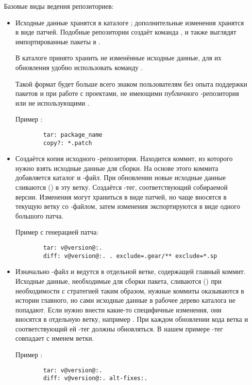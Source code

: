 Базовые виды ведения  репозиториев:
\begin{itemize}
	\item {}
	
	Исходные данные хранятся в каталоге ; дополнительные изменения хранятся в виде патчей.
		Подобные репозитории создаёт команда , и также выглядят импортированные
		пакеты в .
	
	В каталоге  принято хранить не изменённые исходные данные, для их обновления удобно
		использовать команду .
	
	Такой формат будет больше всего знаком пользователям без опыта поддержки пакетов 
		и при работе с проектами, не имеющими публичного -репозитория или не использующими .
	
	Пример :
\begin{verbatim}
        tar: package_name
        copy?: *.patch
\end{verbatim}
	
	\item {}
	
	Создаётся копия исходного -репозитория. Находится коммит, из которого нужно взять исходные
	данные для сборки. На основе этого коммита добавляется каталог  и -файл.
	При обновлении новые исходные данные сливаются () в эту ветку. Создаётся -тег,
	соответствующий собираемой версии. Изменения могут храниться в виде патчей, но чаще вносятся в
	текущую ветку со -файлом, затем изменения экспортируются в виде одного большого патча.
	
	Пример  с генерацией патча:
\begin{verbatim}
        tar: v@version@:.
        diff: v@version@:. . exclude=.gear/** exclude=*.sp
\end{verbatim}
	
	\item {}
	
	Изначально -файл и  ведутся в отдельной ветке, содержащей главный коммит.
		Исходные данные, необходимые для сборки пакета, сливаются () при необходимости
		с  стратегией  таким образом, нужные коммиты оказываются в истории
		главного, но сами исходные данные в рабочее дерево каталога не попадают. Если нужно внести
		какие-то специфичные изменения, они вносятся в отдельную ветку, например .
		При каждом обновлении кода ветка  и соответствующий ей -тег должны
		обновляться. В нашем примере -тег совпадает с именем ветки.
	
	Пример :
\begin{verbatim}
        tar: v@version@:.
        diff: v@version@:. alt-fixes:.
\end{verbatim}
\end{itemize}

